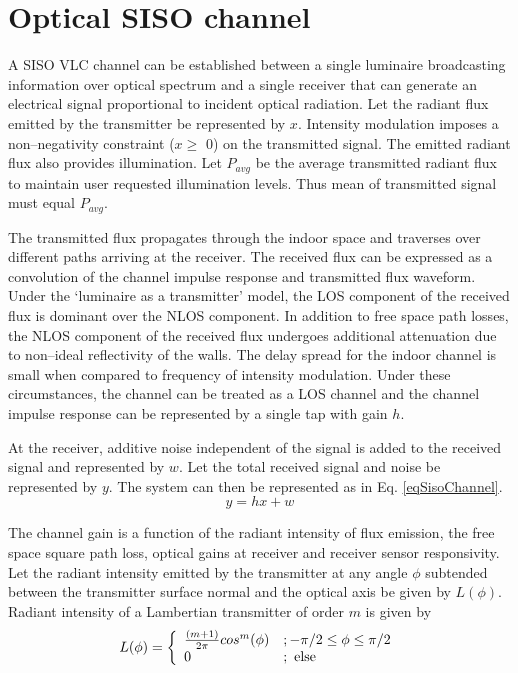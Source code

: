 \section{Optical SISO channel}
\label{sec:sisoChannel}
\graphicspath{{_SISO/Figures/}}

A SISO VLC channel can be established between a single luminaire broadcasting information over optical spectrum  and a single receiver that can generate an electrical signal proportional to incident optical radiation. Let the radiant flux emitted by the transmitter be represented by $x$. Intensity modulation imposes a non--negativity constraint ($x\geq$ 0) on the transmitted signal. The emitted radiant flux also provides illumination. Let $P_{avg}$ be the average transmitted radiant flux to maintain user requested illumination levels. Thus mean of transmitted signal must equal $P_{avg}$.

The transmitted flux propagates through the indoor space and traverses over different paths arriving at the receiver. The received flux can be expressed as a convolution of the channel impulse response and transmitted flux waveform. Under the `luminaire as a transmitter' model, the LOS component of the received flux is dominant over the NLOS component. In addition to free space path losses, the NLOS component of the received flux undergoes additional attenuation due to non--ideal reflectivity of the walls. The delay spread for the indoor channel is small when compared to frequency of intensity modulation. Under these circumstances, the channel can be treated as a LOS channel and the channel impulse response can be represented by a single tap with gain $h$. 

At the receiver, additive noise independent of the signal is added to the received signal and represented by $w$. Let the total received signal and noise be represented by $y$. The system can then be represented as in Eq. \eqref{eqSisoChannel}.
\begin{equation}
	\label{eqSisoChannel}
	y = hx + w
\end{equation}

The channel gain is a function of the radiant intensity of flux emission, the free space square path loss, optical gains at receiver and receiver sensor responsivity. Let the radiant intensity emitted by the transmitter at any angle $\phi$ subtended between the transmitter surface normal and the optical axis be given by $L(\phi)$. Radiant intensity of a Lambertian transmitter of order $m$ is given by
\begin{equation}
	\label{eqLambertian}
	L(\phi) = \left\{ \begin{array}{ll} {\frac{(m+1)}{2\pi}}cos^{m}(\phi) &; -\pi/2\leq\phi\leq\pi/2 \\ 0 &; \mbox{ else} \end{array} \right.
\end{equation}

